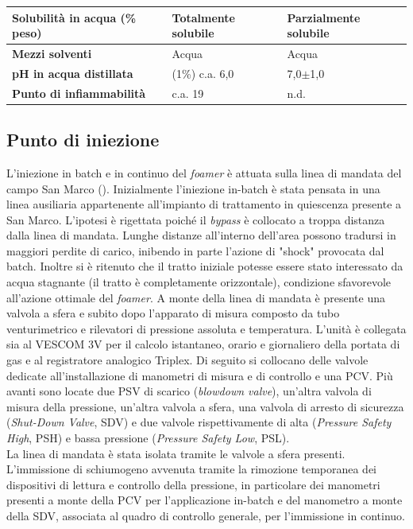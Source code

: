 \begin{table}[htbp]
\begin{tabular}{|p{}|p{}p{}|}
\textbf{Solubilità in acqua (\% peso)}  & Totalmente solubile                           & Parzialmente solubile                         \\\hline
\textbf{Mezzi solventi  }               & Acqua                                         & Acqua                                         \\\hline
\textbf{pH in acqua distillata }        & (1\%) c.a. 6,0                                & 7,0\(\pm\)1,0                                     \\\hline
\textbf{Punto di infiammabilità   }     & c.a. 19                                       & n.d.                                         \\
\hline
\end{tabular}
\end{table}


\subsection{Punto di iniezione}
L'iniezione in batch e in continuo del \textit{foamer} è attuata sulla linea di mandata del campo San Marco (). Inizialmente l'iniezione in-batch è stata pensata in una linea ausiliaria appartenente all'impianto di trattamento in quiescenza presente a San Marco. L'ipotesi è rigettata poiché il \textit{bypass} è collocato a troppa distanza dalla linea di mandata. Lunghe distanze all'interno dell'area possono tradursi in maggiori perdite di carico, inibendo in parte l'azione di "shock" provocata dal batch. Inoltre si è ritenuto che il tratto iniziale potesse essere stato interessato da acqua stagnante (il tratto è completamente orizzontale), condizione sfavorevole all'azione ottimale del \textit{foamer}.
A monte della linea di mandata è presente una valvola a sfera e subito dopo l'apparato di misura composto da tubo venturimetrico e rilevatori di pressione assoluta e temperatura. L'unità è collegata sia al VESCOM 3V per il calcolo istantaneo, orario e giornaliero della portata di gas e al registratore analogico Triplex. Di seguito si collocano delle valvole dedicate all'installazione di manometri di misura e di controllo e una PCV. Più avanti sono locate due PSV di scarico (\textit{blowdown valve}), un'altra valvola di misura della pressione, un'altra valvola a sfera, una valvola di arresto di sicurezza (\textit{Shut-Down Valve}, SDV) e due valvole rispettivamente di alta (\textit{Pressure Safety High}, PSH) e bassa pressione (\textit{Pressure Safety Low}, PSL).\\
La linea di mandata è stata isolata tramite le valvole a sfera presenti. L'immissione di schiumogeno avvenuta tramite la rimozione temporanea dei dispositivi di lettura e controllo della pressione, in particolare dei manometri presenti a monte della PCV per l'applicazione in-batch e del manometro a monte della SDV, associata al quadro di controllo generale, per l'immissione in continuo.

